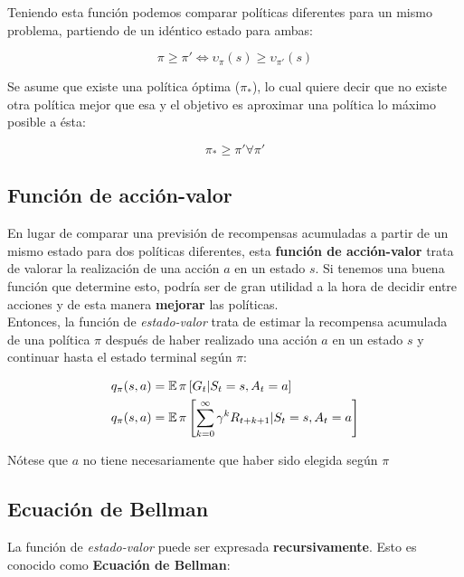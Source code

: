 \documentclass[11pt,fleqn]{book} %
\begin{document}
Teniendo esta función podemos comparar políticas diferentes para un mismo problema, partiendo de un idéntico estado para ambas:

\begin{equation}
\pi\geq\pi'\iff\upsilon_\pi(s)\geq\upsilon_{\pi'}(s) 
\end{equation}

Se asume que existe una política óptima ($\pi_*$), lo cual quiere decir que no existe otra política mejor que esa y el objetivo es aproximar una política lo máximo posible a ésta:

\begin{equation}
\pi_* \geq \pi' \forall \pi'
\end{equation}

\subsection{Función de acción-valor}

En lugar de comparar una previsión de recompensas acumuladas a partir de un mismo estado para dos políticas diferentes, esta \textbf{función de acción-valor} trata de valorar la realización de una acción $a$ en un estado $s$. Si tenemos una buena función que determine esto, podría ser de gran utilidad a la hora de decidir entre acciones y de esta manera \textbf{mejorar} las políticas. \\

Entonces, la función de \textit{estado-valor} trata de estimar la recompensa acumulada de una política $\pi$ después de haber realizado una acción $a$ en un estado $s$ y continuar hasta el estado terminal según $\pi$:

\begin{align}
\begin{split}
q_\pi(s,a)&=\operatorname*{\mathbb{E}}\pi\left[G_t|S_t=s,A_t=a\right]\\
q_\pi(s,a)&=\operatorname*{\mathbb{E}}\pi\left[\sum^\infty_{k=0}\gamma^kR_{t+k+1}|S_t=s,A_t=a\right]
\end{split}
\end{align}

Nótese que $a$ no tiene necesariamente que haber sido elegida según $\pi$

\subsection{Ecuación de Bellman}\label{sec:bellman}

La función de \textit{estado-valor} puede ser expresada \textbf{recursivamente}. Esto es conocido como \textbf{Ecuación de Bellman}:
\end{document}
